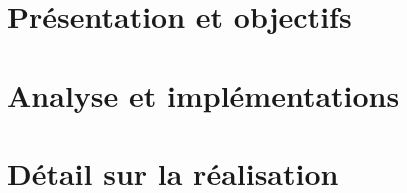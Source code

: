 \documentclass[a4paper,12pt]{report}
\begin{document}
        
        \tableofcontents
        
        \part{Présentation et objectifs}
        
        
        \part{Analyse et implémentations}
        
        
        \part{Détail sur la réalisation}
        
        
        
        \newpage
        \appendix
        
\end{document}
